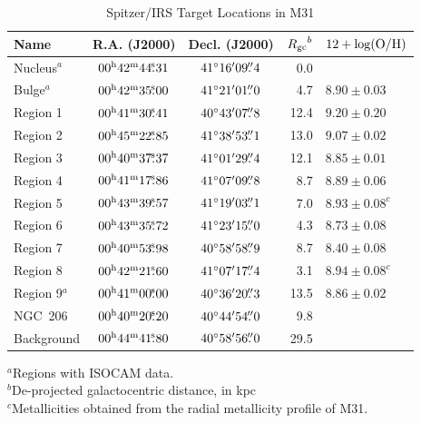 \begin{table}
 \centering
 \begin{minipage}{90mm}
\caption{Spitzer/IRS Target Locations in M31
\label{regions}}
\begin{tabular}{lccrl}
\hline Name & R.A. (J2000) & Decl. (J2000) & ${R_{\rm gc}}^b$ & $12+\log({\rm O/H})$
\\
 \hline
Nucleus$^a$ & $00^{\rmn{h}}42^{\rmn{m}}44\fs31$ & $41\hbox{$^\circ$}16\hbox{$^\prime$}09\hbox{$.\!\!^{\prime\prime}$}4$  & 0.0 & \\
Bulge$^a$   & $00^{\rmn{h}}42^{\rmn{m}}35\fs00$ & $41\hbox{$^\circ$}21\hbox{$^\prime$}01\hbox{$.\!\!^{\prime\prime}$}0$  & 4.7 &$8.90\pm0.03$\\
Region 1    & $00^{\rmn{h}}41^{\rmn{m}}30\fs41$ & $40\hbox{$^\circ$}43\hbox{$^\prime$}07\hbox{$.\!\!^{\prime\prime}$}8$  & 12.4 &$9.20\pm0.20$\\
Region 2    & $00^{\rmn{h}}45^{\rmn{m}}22\fs85$ & $41\hbox{$^\circ$}38\hbox{$^\prime$}53\hbox{$.\!\!^{\prime\prime}$}1$  & 13.0 &$9.07\pm0.02$\\
Region 3    & $00^{\rmn{h}}40^{\rmn{m}}37\fs37$ & $41\hbox{$^\circ$}01\hbox{$^\prime$}29\hbox{$.\!\!^{\prime\prime}$}4$  & 12.1 &$8.85\pm0.01$\\
Region 4    & $00^{\rmn{h}}41^{\rmn{m}}17\fs86$ & $41\hbox{$^\circ$}07\hbox{$^\prime$}09\hbox{$.\!\!^{\prime\prime}$}8$  & 8.7 &$8.89\pm0.06$\\
Region 5    & $00^{\rmn{h}}43^{\rmn{m}}39\fs57$ & $41\hbox{$^\circ$}19\hbox{$^\prime$}03\hbox{$.\!\!^{\prime\prime}$}1$  & 7.0 &$8.93\pm0.08^c$\\
Region 6    & $00^{\rmn{h}}43^{\rmn{m}}35\fs72$ & $41\hbox{$^\circ$}23\hbox{$^\prime$}15\hbox{$.\!\!^{\prime\prime}$}0$  & 4.3 &$8.73\pm0.08$\\
Region 7    & $00^{\rmn{h}}40^{\rmn{m}}53\fs98$ & $40\hbox{$^\circ$}58\hbox{$^\prime$}58\hbox{$.\!\!^{\prime\prime}$}9$  & 8.7 &$8.40\pm0.08$\\
Region 8    & $00^{\rmn{h}}42^{\rmn{m}}21\fs60$ & $41\hbox{$^\circ$}07\hbox{$^\prime$}17\hbox{$.\!\!^{\prime\prime}$}4$  & 3.1 &$8.94\pm0.08^c$\\
Region 9$^a$& $00^{\rmn{h}}41^{\rmn{m}}00\fs00$ & $40\hbox{$^\circ$}36\hbox{$^\prime$}20\hbox{$.\!\!^{\prime\prime}$}3$  & 13.5 &$8.86\pm0.02$\\
NGC~206     & $00^{\rmn{h}}40^{\rmn{m}}20\fs20$ & $40\hbox{$^\circ$}44\hbox{$^\prime$}54\hbox{$.\!\!^{\prime\prime}$}0$  & 9.8 & \\
Background  & $00^{\rmn{h}}44^{\rmn{m}}41\fs80 $ & $40\hbox{$^\circ$}58\hbox{$^\prime$}56\hbox{$.\!\!^{\prime\prime}$}0$  & 29.5 & \\
\hline
\end{tabular}
{$^a$Regions with ISOCAM data.\\
$^b$De-projected galactocentric distance, in kpc\\ 
$^c$Metallicities obtained from the radial metallicity profile of M31.}
\end{minipage}
\end{table}

